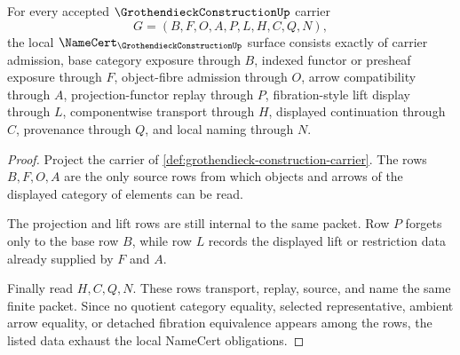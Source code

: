 \begin{theorem}
\label{thm:grothendieck-construction-namecert-obligations}
For every accepted $\GrothendieckConstructionUp$ carrier
$$
G=(B,F,O,A,P,L,H,C,Q,N),
$$
the local $\NameCert_{\GrothendieckConstructionUp}$ surface consists exactly of carrier admission, base category exposure through $B$, indexed functor or presheaf exposure through $F$, object-fibre admission through $O$, arrow compatibility through $A$, projection-functor replay through $P$, fibration-style lift display through $L$, componentwise transport through $H$, displayed continuation through $C$, provenance through $Q$, and local naming through $N$.
\end{theorem}
\begin{proof}
Project the carrier of \autoref{def:grothendieck-construction-carrier}. The rows $B,F,O,A$ are the only source rows from which objects and arrows of the displayed category of elements can be read.

The projection and lift rows are still internal to the same packet. Row $P$ forgets only to the base row $B$, while row $L$ records the displayed lift or restriction data already supplied by $F$ and $A$.

Finally read $H,C,Q,N$. These rows transport, replay, source, and name the same finite packet. Since no quotient category equality, selected representative, ambient arrow equality, or detached fibration equivalence appears among the rows, the listed data exhaust the local NameCert obligations.
\end{proof}

